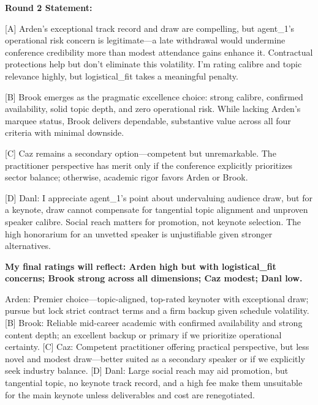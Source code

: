 \begin{tcolorbox}[mbox-neutral={agent\_2 -- discussion r2}]
\textbf{Round 2 Statement:}

[A] Arden's exceptional track record and draw are compelling, but agent\_1's operational risk concern is legitimate---a late withdrawal would undermine conference credibility more than modest attendance gains enhance it. Contractual protections help but don't eliminate this volatility. I'm rating calibre and topic relevance highly, but logistical\_fit takes a meaningful penalty.

[B] Brook emerges as the pragmatic excellence choice: strong calibre, confirmed availability, solid topic depth, and zero operational risk. While lacking Arden's marquee status, Brook delivers dependable, substantive value across all four criteria with minimal downside.

[C] Caz remains a secondary option---competent but unremarkable. The practitioner perspective has merit only if the conference explicitly prioritizes sector balance; otherwise, academic rigor favors Arden or Brook.

[D] Danl: I appreciate agent\_1's point about undervaluing audience draw, but for a keynote, draw cannot compensate for tangential topic alignment and unproven speaker calibre. Social reach matters for promotion, not keynote selection. The high honorarium for an unvetted speaker is unjustifiable given stronger alternatives.

\textbf{My final ratings will reflect: Arden high but with logistical\_fit concerns; Brook strong across all dimensions; Caz modest; Danl low.}
\end{tcolorbox}

\begin{tcolorbox}[mbox-neutral={agent\_3 -- discussion r2}]
[A] Arden: Premier choice---topic-aligned, top-rated keynoter with exceptional draw; pursue but lock strict contract terms and a firm backup given schedule volatility.  
[B] Brook: Reliable mid-career academic with confirmed availability and strong content depth; an excellent backup or primary if we prioritize operational certainty.  
[C] Caz: Competent practitioner offering practical perspective, but less novel and modest draw---better suited as a secondary speaker or if we explicitly seek industry balance.  
[D] Danl: Large social reach may aid promotion, but tangential topic, no keynote track record, and a high fee make them unsuitable for the main keynote unless deliverables and cost are renegotiated.
\end{tcolorbox}


